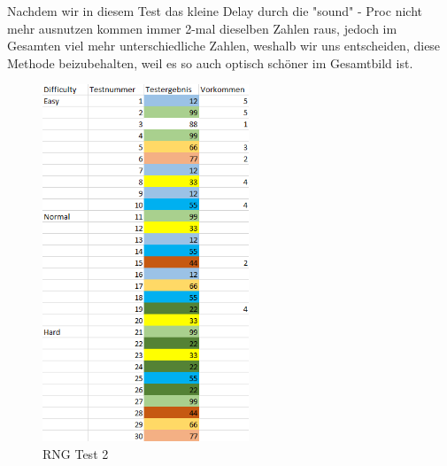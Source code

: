 \documentclass[a4paper,10pt]{article}
\begin{document}
			Nachdem wir in diesem Test das kleine Delay durch die "sound" - 
			Proc nicht mehr ausnutzen kommen immer 2-mal dieselben Zahlen raus, 
			jedoch im Gesamten viel mehr unterschiedliche Zahlen, weshalb wir 
			uns entscheiden, diese Methode beizubehalten, weil es so auch 
			optisch schöner im Gesamtbild ist.
			\begin{figure}[h]
				\centering
				\includegraphics[width=0.55\textwidth]{tests_2}
				\caption{RNG Test 2}
				\label{RNG2}
			\end{figure}
			\newpage
\end{document}
